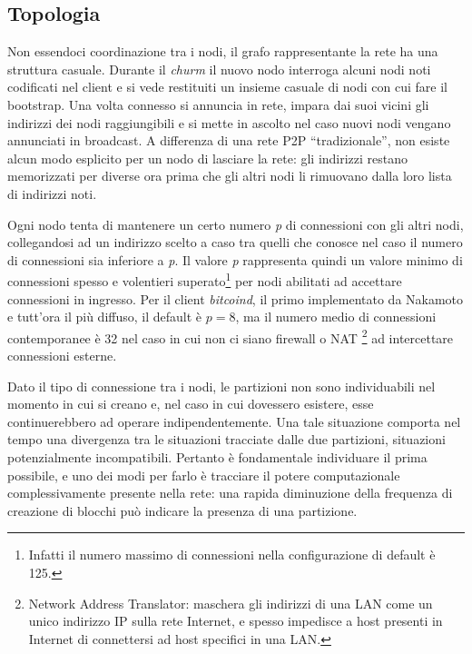 \subsection{Topologia}\label{topologia}

Non essendoci coordinazione tra i nodi, il grafo rappresentante la rete ha una struttura casuale. Durante il \emph{churm} il nuovo nodo interroga alcuni nodi noti codificati nel client e si vede restituiti un insieme casuale di nodi con cui fare il bootstrap. Una volta connesso si annuncia in rete, impara dai suoi vicini gli indirizzi dei nodi raggiungibili e si mette in ascolto nel caso nuovi nodi vengano annunciati in broadcast. A differenza di una rete P2P ``tradizionale'', non esiste alcun modo esplicito per un nodo di lasciare la rete: gli indirizzi restano memorizzati per diverse ora prima che gli altri nodi li rimuovano dalla loro lista di indirizzi noti.

Ogni nodo tenta di mantenere un certo numero \emph{p} di connessioni con gli altri nodi, collegandosi ad un indirizzo scelto a caso tra quelli che conosce nel caso il numero di connessioni sia inferiore a \emph{p}. Il valore \emph{p} rappresenta quindi un valore minimo di connessioni spesso e volentieri superato\footnote{Infatti il numero massimo di connessioni nella configurazione di default è 125.} per nodi abilitati ad accettare connessioni in ingresso. Per il client \emph{bitcoind}, il primo implementato da Nakamoto e tutt'ora il più diffuso, il default è $p=8$, ma il numero medio di connessioni contemporanee è 32 nel caso in cui non ci siano firewall o NAT \footnote{Network Address Translator: maschera   gli indirizzi di una LAN come un unico indirizzo IP sulla rete   Internet, e spesso impedisce a host presenti in Internet di   connettersi ad host specifici in una LAN.} ad intercettare connessioni esterne.

Dato il tipo di connessione tra i nodi, le partizioni non sono individuabili nel momento in cui si creano e, nel caso in cui dovessero esistere, esse continuerebbero ad operare indipendentemente. Una tale situazione comporta nel tempo una divergenza tra le situazioni tracciate dalle due partizioni, situazioni potenzialmente incompatibili. Pertanto è fondamentale individuare il prima possibile, e uno dei modi per farlo è tracciare il potere computazionale complessivamente presente nella rete: una rapida diminuzione della frequenza di creazione di blocchi può indicare la presenza di una partizione.

